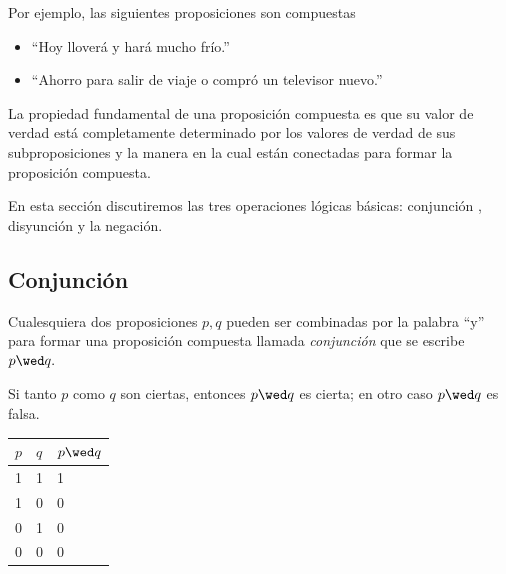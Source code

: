     Por ejemplo, las siguientes proposiciones son compuestas
    \begin{itemize}
        \item ``Hoy lloverá y hará mucho frío.''
        \item ``Ahorro para salir de viaje o compró un televisor nuevo.''
    \end{itemize}




    La propiedad fundamental de una proposición compuesta es que su valor de verdad está completamente determinado por los valores de verdad de sus subproposiciones y la manera en la cual están conectadas para formar la proposición compuesta.


    En esta sección discutiremos las tres operaciones lógicas básicas: conjunción , disyunción  y la negación.


\subsection{Conjunción}


    Cualesquiera dos proposiciones $p,q$ pueden ser combinadas por la palabra ``y'' para formar una proposición compuesta llamada \emph{conjunción} que se escribe $p\wed q.$



    \begin{definicion}
        Si tanto $p$ como $q$ son ciertas, entonces $p \wed q$ es cierta; en otro caso $p\wed q$ es falsa.
    \end{definicion}

	\begin{tdv}[Conjunción]\hfill
		\label{tdv:and}
		\begin{center}
			\begin{tabular}{|l|l|l|}\hline
				$p$ & $q$ & $p \wed q$\\\hline
				1 & 1 & 1\\\hline
				1 & 0 & 0\\\hline
				0 & 1 & 0\\\hline
				0 & 0 & 0\\\hline
			\end{tabular}
		\end{center}
	\end{tdv}



